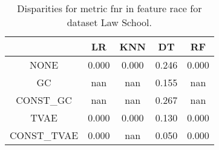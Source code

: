 \begin{table}
\caption{Disparities for metric fnr in feature race for dataset Law School.}
\label{tab:disp-LAW SCHOOL-race-fnr}
\begin{tabular}{ccccc}
\toprule
 & LR & KNN & DT & RF \\
\midrule
NONE & 0.000 & 0.000 & 0.246 & 0.000 \\
GC & nan & nan & 0.155 & nan \\
CONST\_GC & nan & nan & 0.267 & nan \\
TVAE & 0.000 & 0.000 & 0.130 & 0.000 \\
CONST\_TVAE & 0.000 & nan & 0.050 & 0.000 \\
\bottomrule
\end{tabular}
\end{table}
